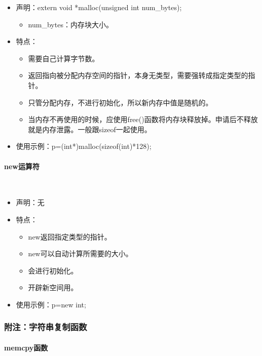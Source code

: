 \documentclass[UTF8]{article}%
\begin{document}
\begin{itemize}
    \item 声明：extern void *malloc(unsigned int num\_bytes);
    {
    \begin{itemize}
        \item num\_bytes：内存块大小。
    \end{itemize}
    }
    \item 特点：
    {
    \begin{itemize}
        \item 需要自己计算字节数。
        \item 返回指向被分配内存空间的指针，本身无类型，需要强转成指定类型的指针。
        \item 只管分配内存，不进行初始化，所以新内存中值是随机的。
        \item 当内存不再使用的时候，应使用free()函数将内存块释放掉。申请后不释放就是内存泄露。一般跟sizeof一起使用。
    \end{itemize}
    }
    \item 使用示例：p=(int*)malloc(sizeof(int)*128);
\end{itemize}

\paragraph{new运算符}~{}

\begin{itemize}
    \item 声明：无
    \item 特点：
    {
    \begin{itemize}
        \item new返回指定类型的指针。
        \item new可以自动计算所需要的大小。
        \item 会进行初始化。
        \item 开辟新空间用。
    \end{itemize}
    }
    \item 使用示例：p=new int;
\end{itemize}



\subsubsection{附注：字符串复制函数}

\paragraph{memcpy函数}~{}
\end{document}
